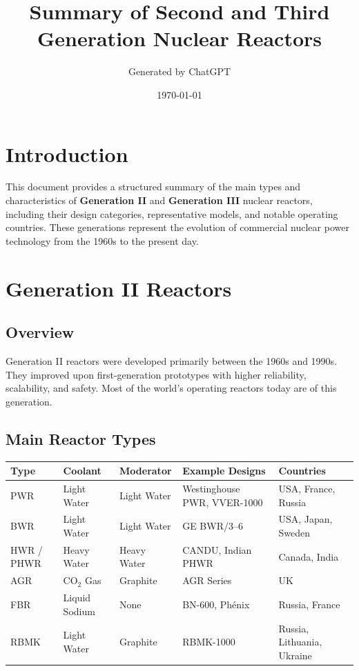 \documentclass[a4paper,12pt]{article}
\title{\textbf{Summary of Second and Third Generation Nuclear Reactors}}
\author{Generated by ChatGPT}
\date{\today}
\begin{document}
\maketitle

\section{Introduction}
This document provides a structured summary of the main types and characteristics of \textbf{Generation II} and \textbf{Generation III} nuclear reactors, including their design categories, representative models, and notable operating countries. These generations represent the evolution of commercial nuclear power technology from the 1960s to the present day.

\section{Generation II Reactors}

\subsection{Overview}
Generation II reactors were developed primarily between the 1960s and 1990s. They improved upon first-generation prototypes with higher reliability, scalability, and safety. Most of the world’s operating reactors today are of this generation.

\subsection{Main Reactor Types}

\begin{longtable}{p{3cm}p{3cm}p{3cm}p{4cm}p{3cm}}
\toprule
\textbf{Type} & \textbf{Coolant} & \textbf{Moderator} & \textbf{Example Designs} & \textbf{Countries} \\
\midrule
PWR & Light Water & Light Water & Westinghouse PWR, VVER-1000 & USA, France, Russia \\
BWR & Light Water & Light Water & GE BWR/3--6 & USA, Japan, Sweden \\
HWR / PHWR & Heavy Water & Heavy Water & CANDU, Indian PHWR & Canada, India \\
AGR & CO$_2$ Gas & Graphite & AGR Series & UK \\
FBR & Liquid Sodium & None & BN-600, Phénix & Russia, France \\
RBMK & Light Water & Graphite & RBMK-1000 & Russia, Lithuania, Ukraine \\
\bottomrule
\end{longtable}
\end{document}
